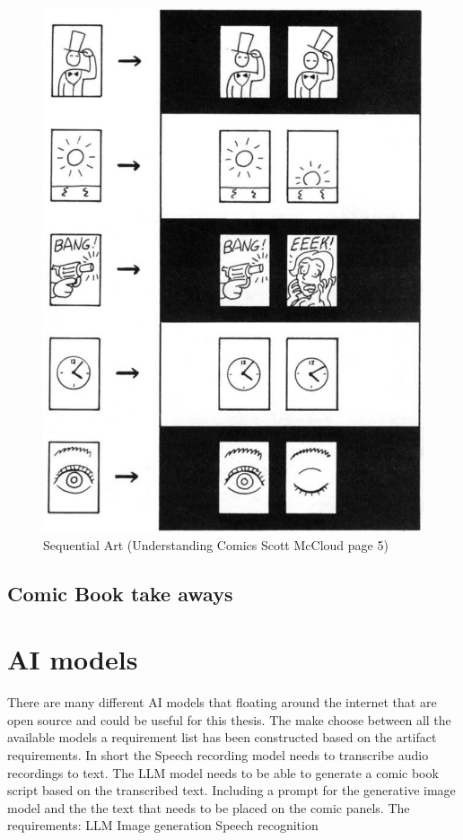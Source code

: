 \begin{figure}[!htp]
	\centering
	\includegraphics[scale=0.45]{images/SequentalArtUnderstandingComicPage5.png}
	\caption[Sequential Art]{Sequential Art (Understanding Comics Scott McCloud page 5)}
	\label{fig:Sequential Art}
\end{figure}



\subsection{Comic Book take aways}

\section{AI models}
There are many different AI models that floating around the internet that are open source and could be useful for this thesis. The make choose between all the available models a requirement list has been constructed based on the artifact requirements. In short the Speech recording model needs to transcribe audio recordings to text. The LLM model needs to be able to generate a comic book script based on the transcribed text. Including a prompt for the generative image model and the the text that needs to be placed on the comic panels.
The requirements:
LLM
Image generation
Speech recognition

